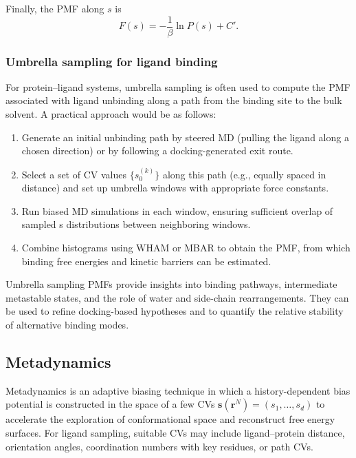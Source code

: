 \documentclass[12pt]{article}
\begin{document}
Finally, the PMF along $s$ is
\[
F(s) = -\frac{1}{\beta}\ln P(s) + C'.
\]

\subsubsection{Umbrella sampling for ligand binding}

For protein--ligand systems, umbrella sampling is often used to compute the PMF associated with ligand unbinding along a path from the binding site to the bulk solvent.\cite{CH9_TorrieValleau1977,CH9_Roux1995,CH9_Kastner2011} A practical approach would be as follows:

\begin{enumerate}
\item Generate an initial unbinding path by steered MD (pulling the ligand along a chosen direction) or by following a docking-generated exit route.
\item Select a set of CV values $\{s_0^{(k)}\}$ along this path (e.g., equally spaced in distance) and set up umbrella windows with appropriate force constants.
\item Run biased MD simulations in each window, ensuring sufficient overlap of sampled s distributions between neighboring windows.
\item Combine histograms using WHAM or MBAR to obtain the PMF, from which binding free energies and kinetic barriers can be estimated.
\end{enumerate}

Umbrella sampling PMFs provide insights into binding pathways, intermediate metastable states, and the role of water and side-chain rearrangements. They can be used to refine docking-based hypotheses and to quantify the relative stability of alternative binding modes.

\subsection{Metadynamics}

Metadynamics is an adaptive biasing technique in which a history-dependent bias potential is constructed in the space of a few CVs $\mathbf{s}(\mathbf{r}^N) = (s_1,\dots,s_d)$ to accelerate the exploration of conformational space and reconstruct free energy surfaces.\cite{CH9_LaioParrinello2002,CH9_Barducci2008} For ligand sampling, suitable CVs may include ligand--protein distance, orientation angles, coordination numbers with key residues, or path CVs.
\end{document}
